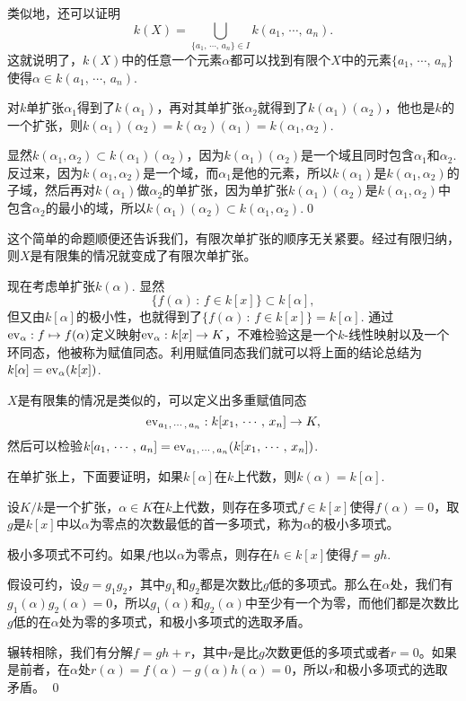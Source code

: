 类似地，还可以证明
\[
	k(X)=\bigcup_{\{a_1,\,\cdots,\,a_n\}\in I} k(a_1,\,\cdots,\,a_n).
\]
这就说明了，$k(X)$中的任意一个元素$\alpha$都可以找到有限个$X$中的元素$\{a_1,\,\cdots,\,a_n\}$使得$\alpha\in k(a_1,\,\cdots,\,a_n)$.

\pro 对$k$单扩张$\alpha_1$得到了$k(\alpha_1)$，再对其单扩张$\alpha_2$就得到了$k(\alpha_1)(\alpha_2)$，他也是$k$的一个扩张，则$k(\alpha_1)(\alpha_2)= k(\alpha_2)(\alpha_1)=k(\alpha_1,\alpha_2)$.

\proof 显然$k(\alpha_1,\alpha_2)\subset k(\alpha_1)(\alpha_2)$，因为$k(\alpha_1)(\alpha_2)$是一个域且同时包含$\alpha_1$和$\alpha_2$. 反过来，因为$k(\alpha_1,\alpha_2)$是一个域，而$\alpha_1$是他的元素，所以$k(\alpha_1)$是$k(\alpha_1,\alpha_2)$的子域，然后再对$k(\alpha_1)$做$\alpha_2$的单扩张，因为单扩张$k(\alpha_1)(\alpha_2)$是$k(\alpha_1,\alpha_2)$中包含$\alpha_2$的最小的域，所以$k(\alpha_1)(\alpha_2)\subset k(\alpha_1,\alpha_2)$.\qed

这个简单的命题顺便还告诉我们，有限次单扩张的顺序无关紧要。经过有限归纳，则$X$是有限集的情况就变成了有限次单扩张。

\para 现在考虑单扩张$k(\alpha)$. 显然
\[
	\{f(\alpha)\,:\, f\in k[x]\}\subset k[\alpha],
\]
但又由$k[\alpha]$的极小性，也就得到了$\{f(\alpha)\,:\, f\in k[x]\}=k[\alpha]$. 通过$\operatorname{ev}_{\alpha}:f\mapsto f(\alpha)$定义映射$\operatorname{ev}_{\alpha}:k[x]\to K$，不难检验这是一个$k$-线性映射以及一个环同态，他被称为赋值同态。利用赋值同态我们就可以将上面的结论总结为$k[\alpha]=\operatorname{ev}_{\alpha}(k[x])$.

$X$是有限集的情况是类似的，可以定义出多重赋值同态
\[
	\operatorname{ev}_{a_1,\,\cdots,\,a_n}:k[x_1,\,\cdots,\,x_n]\to K,
\]
然后可以检验$k[a_1,\,\cdots,\,a_n]=\operatorname{ev}_{a_1,\,\cdots,\,a_n}(k[x_1,\,\cdots,\,x_n])$.

在单扩张上，下面要证明，如果$k[\alpha]$在$k$上代数，则$k(\alpha)=k[\alpha]$.

\para 设$K/k$是一个扩张，$\alpha\in K$在$k$上代数，则存在多项式$f\in k[x]$使得$f(\alpha)=0$，取$g$是$k[x]$中以$\alpha$为零点的次数最低的首一多项式，称为$\alpha$的极小多项式。

\lem 极小多项式不可约。如果$f$也以$\alpha$为零点，则存在$h\in k[x]$使得$f=gh$.

\proof 
	假设可约，设$g=g_1g_2$，其中$g_1$和$g_2$都是次数比$g$低的多项式。那么在$\alpha$处，我们有$g_1(\alpha)g_2(\alpha)=0$，所以$g_1(\alpha)$和$g_2(\alpha)$中至少有一个为零，而他们都是次数比$g$低的在$\alpha$处为零的多项式，和极小多项式的选取矛盾。

	辗转相除，我们有分解$f=gh+r$，其中$r$是比$g$次数更低的多项式或者$r=0$。如果是前者，在$\alpha$处$r(\alpha)=f(\alpha)-g(\alpha)h(\alpha)=0$，所以$r$和极小多项式的选取矛盾。
\qed

